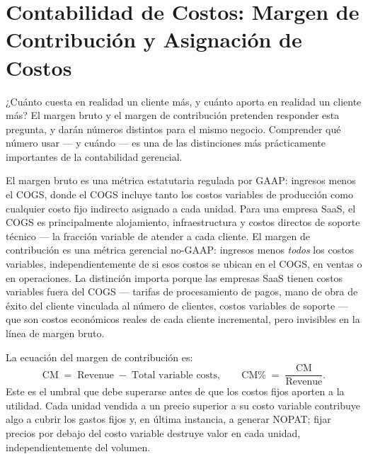 \section{Contabilidad de Costos: Margen de Contribución y Asignación de Costos}\label{sec:cost-accounting}

¿Cuánto cuesta en realidad un cliente más, y cuánto aporta en realidad un cliente más? El margen
bruto y el margen de contribución pretenden responder esta pregunta, y darán números distintos para
el mismo negocio. Comprender qué número usar --- y cuándo --- es una de las distinciones más
prácticamente importantes de la contabilidad gerencial.

El margen bruto es una métrica estatutaria regulada por GAAP: ingresos menos el COGS, donde el
COGS incluye tanto los costos variables de producción como cualquier costo fijo indirecto asignado
a cada unidad. Para una empresa SaaS, el COGS es principalmente alojamiento, infraestructura y
costos directos de soporte técnico --- la fracción variable de atender a cada cliente. El margen de
contribución es una métrica gerencial no-GAAP: ingresos menos \emph{todos} los costos variables,
independientemente de si esos costos se ubican en el COGS, en ventas o en operaciones. La
distinción importa porque las empresas SaaS tienen costos variables fuera del COGS --- tarifas de
procesamiento de pagos, mano de obra de éxito del cliente vinculada al número de clientes, costos
variables de soporte --- que son costos económicos reales de cada cliente incremental, pero
invisibles en la línea de margen bruto.

La ecuación del margen de contribución es:
\begin{equation}\label{eq:contribution-margin}
  \mathrm{CM} \;=\; \text{Revenue} \;-\; \text{Total variable costs},
  \qquad
  \mathrm{CM\%} \;=\; \frac{\mathrm{CM}}{\text{Revenue}}.
\end{equation}
Este es el umbral que debe superarse antes de que los costos fijos aporten a la utilidad. Cada
unidad vendida a un precio superior a su costo variable contribuye algo a cubrir los gastos fijos
y, en última instancia, a generar NOPAT; fijar precios por debajo del costo variable destruye
valor en cada unidad, independientemente del volumen.

